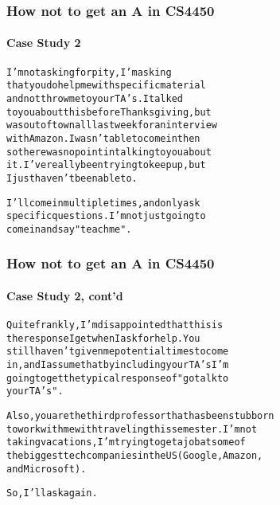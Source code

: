 \documentclass{beamer}
\begin{document}
\begin{frame}[fragile]
\frametitle{How not to get an A in CS4450}
\framesubtitle{Case Study 2}

{\small
\begin{alltt}
{\color{red}{I have more than three days left.  
The final isn't till next Thursday. }}
I'm not asking for pity, I'm asking 
that you do help me with specific material 
and not throw me to your TA's.  I talked 
to you about this before Thanksgiving, but 
was out of town all last week for an interview 
with Amazon.  I wasn't able to come in then 
so there was no point in talking to you about 
it.  I've really been trying to keep up, but 
I just haven't been able to.  

I'll come in multiple times, and only ask 
specific questions.  I'm not just going to 
come in and say "teach me".  
\end{alltt}}

\end{frame}

\begin{frame}[fragile]
\frametitle{How not to get an A in CS4450}
\framesubtitle{Case Study 2, cont'd}

{\small
\begin{alltt}
Quite frankly, I'm disappointed that this is 
the response I get when I ask for help.  You 
still haven't given me potential times to come 
in, and I assume that by including your TA's I'm 
going to get the typical response of "go talk to 
your TA's".  {\color{red}{I don't pay this University though 
to talk to TA's.  I pay to get help from a professor. }}

Also, you are the third professor that has been stubborn 
to work with me with traveling this semester. I'm not 
taking vacations, I'm trying to get a job at some of 
the biggest tech companies in the US (Google, Amazon, 
and Microsoft).  {\color{blue}{This University is supposed to enable 
me to succeed, not impede me.  }}

So, I'll ask again. {\color{green}{When can I come talk to you about 
the material in class so I can pass this class, and 
more importantly, understand the material?}}  
\end{alltt}
}

\end{frame}
\end{document}
